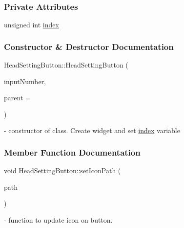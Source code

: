 \subsubsection*{Private Attributes}
\begin{DoxyCompactItemize}
\item 
unsigned int \mbox{\hyperlink{classHeadSettingButton_ad583fdc744e019c787477694427cdde0}{index}}
\end{DoxyCompactItemize}


\subsubsection{Constructor \& Destructor Documentation}
\mbox{\label{classHeadSettingButton_a098c4f2a77e710e4034b085923b1a556}} 
{\footnotesize\ttfamily Head\+Setting\+Button\+::\+\texorpdfstring{Head\+Setting\+Button}{HeadSettingButton} (\begin{DoxyParamCaption}\item[{unsigned int}]{input\+Number,  }\item[{Q\+Widget $\ast$}]{parent = {} }\end{DoxyParamCaption}){\ttfamily [inline]}} - constructor of class. Create widget and set \hyperlink{classHeadSettingButton_ad583fdc744e019c787477694427cdde0}{index} variable

\subsubsection{Member Function Documentation}
\mbox{\label{classHeadSettingButton_a9fe218e02cfc06467659eabbd7f4a794}} 
{\footnotesize\ttfamily void Head\+Setting\+Button\+::\texorpdfstring{set\+Icon\+Path}{setIconPath} (\begin{DoxyParamCaption}\item[{Q\+String}]{path }\end{DoxyParamCaption}){\ttfamily [inline]}} - function to update icon on button.

